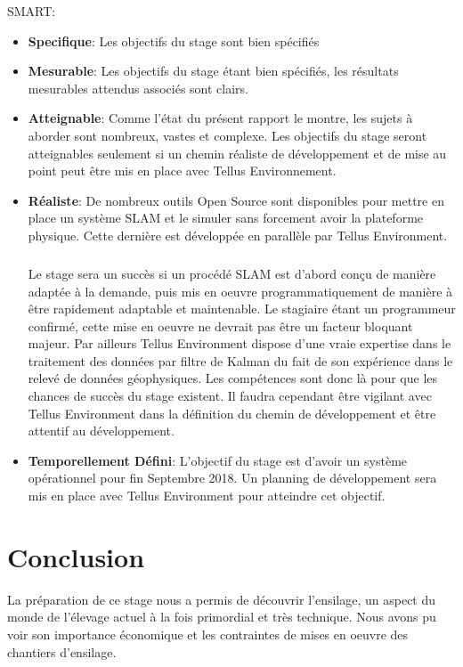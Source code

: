 \documentclass[12pt,a4paper]{report}
\begin{document}
SMART:\begin{itemize}
	\item \textbf{Specifique}: Les objectifs du stage sont bien spécifiés
	\item \textbf{Mesurable}: Les objectifs du stage étant bien spécifiés, les résultats mesurables attendus associés sont clairs.
	\item \textbf{Atteignable}: Comme l'état du présent rapport le montre, les sujets à aborder sont nombreux, vastes et complexe. Les objectifs du stage seront atteignables seulement si un chemin réaliste de développement et de mise au point peut être mis en place avec Tellus Environnement. 
	\item \textbf{Réaliste}: De nombreux outils Open Source sont disponibles pour mettre en place un système SLAM et le simuler sans forcement avoir la plateforme physique. Cette dernière est développée en parallèle par Tellus Environment.
	
	\paragraph{} Le stage sera un succès si un procédé SLAM est d'abord conçu de manière adaptée à la demande, puis mis en oeuvre programmatiquement de manière à être rapidement adaptable et maintenable. Le stagiaire étant un programmeur confirmé, cette mise en oeuvre ne devrait pas être un facteur bloquant majeur. Par ailleurs Tellus Environment dispose d'une vraie expertise dans le traitement des données par filtre de Kalman du fait de son expérience dans le relevé de données géophysiques. Les compétences sont donc là pour que les chances de succès du stage existent. Il faudra cependant être vigilant avec Tellus Environment dans la définition du chemin de développement et être attentif au développement. 
	\item \textbf{Temporellement Défini}: L'objectif du stage est d'avoir un système opérationnel pour fin Septembre 2018. Un planning de développement sera mis en place avec Tellus Environment pour atteindre cet objectif.
\end{itemize}

\chapter{Conclusion}

La préparation de ce stage nous a permis de découvrir l'ensilage, un aspect du monde de l'élevage actuel à la fois primordial et très technique. Nous avons pu voir son importance économique et les contraintes de mises en oeuvre des chantiers d'ensilage.
\end{document}
